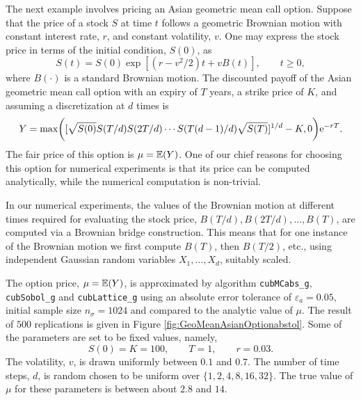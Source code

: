 \documentclass{iitthesis}
\theoremstyle{definition}
\begin{document}
\label{subsec:asiancallopt}
The next example involves pricing an Asian geometric mean call option.  Suppose that the price of a stock $S$ at time $t$ follows a geometric Brownian motion with constant interest rate, $r$, and constant volatility, $v$.  
One may express the stock price in terms of the initial condition, $S(0)$, as 
\[
S(t)=S(0) \exp[(r-v^2/2)t + v B(t)], \qquad t \ge 0,
\]
where $B(\cdot)$ is a standard Brownian motion.  
The discounted payoff of the Asian geometric mean call option with an expiry of $T$ years, a strike price of $K$, and assuming a discretization at $d$ times is 
\begin{equation} \label{payoff}
Y=\max\biggl([\sqrt{S(0)}S(T/d) S(2T/d)\cdots S(T(d-1)/d) \sqrt{S(T)}]^{1/d} - K,0 \biggr)\mathrm{e}^{-rT}.
\end{equation}
The fair price of this option is $\mu=\mathbb{E}(Y)$. One of our chief reasons for choosing this option for numerical experiments is that its price can be computed analytically, while the numerical computation is non-trivial.

In our numerical experiments, the values of the Brownian motion at different times required for evaluating the stock price, $B(T/d), B(2T/d), \ldots,  B(T)$, are computed via a Brownian bridge construction.  This means that for one instance of the Brownian motion we first compute $B(T)$, then $B(T/2)$, etc., using independent Gaussian random variables $X_1, \ldots, X_d$, suitably scaled. 


The option price, $\mu=\mathbb{E}(Y)$, is approximated by algorithm {\tt cubMCabs\_g}, {\tt cubSobol\_g} and {\tt cubLattice\_g} using an absolute error tolerance of $\varepsilon_a=0.05$, initial sample size $n_\sigma=1024$ and compared to the analytic value of $\mu$.  The result of $500$ replications is given in Figure \ref{fig:GeoMeanAsianOptionabstol}.  Some of the parameters are set to be fixed values, namely,
\[
S(0)=K=100, \qquad T=1, \qquad r=0.03.
\]
The volatility, $v$, is drawn uniformly between $0.1$ and $0.7$.  The number of time steps, $d$, is random chosen to be uniform over $\{1, 2, 4, 8, 16, 32\}$.  The true value of $\mu$ for these parameters is between about $2.8$ and $14$.
\end{document}
